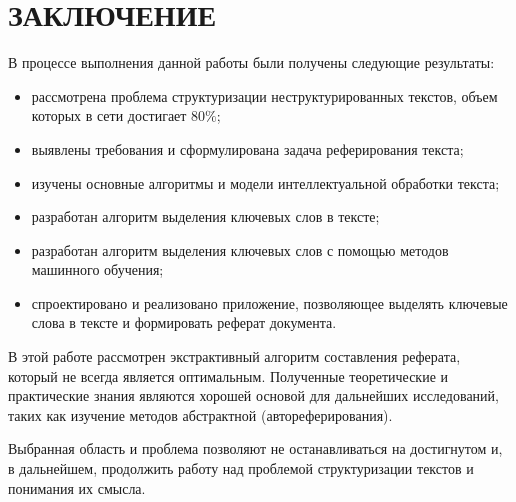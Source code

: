 \chapter*{ЗАКЛЮЧЕНИЕ}

В процессе выполнения данной работы были получены следующие результаты:

\begin{itemize}
\item рассмотрена проблема структуризации неструктурированных текстов, объем которых в сети достигает $80\%$;
\item выявлены требования и сформулирована задача реферирования текста;
\item изучены основные алгоритмы и модели интеллектуальной обработки текста;
\item разработан алгоритм выделения ключевых слов в тексте;
\item разработан алгоритм выделения ключевых слов  с помощью методов машинного обучения;
\item спроектировано и реализовано приложение, позволяющее выделять ключевые слова в тексте и формировать реферат документа.
\end{itemize}

В этой работе рассмотрен экстрактивный алгоритм составления реферата, который не всегда является оптимальным. Полученные теоретические и практические знания являются хорошей основой для дальнейших исследований, таких как изучение методов абстрактной (автореферирования).

Выбранная область и проблема позволяют не останавливаться на достигнутом и, в дальнейшем, продолжить работу над проблемой структуризации текстов и понимания их смысла.
\newpage
